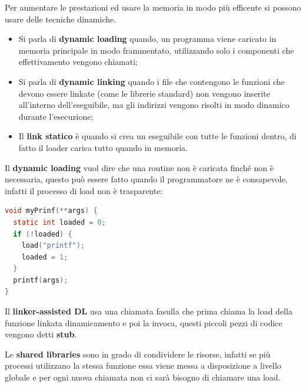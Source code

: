 \documentclass[12pt]{article}
\begin{document}
Per aumentare le prestazioni ed usare la memoria in modo pi\`u efficente si possono usare delle tecniche dinamiche.
\begin{itemize}
  \item Si parla di \textbf{dynamic loading} quando, un programma viene caricato in memoria principale in modo frammentato, utilizzando solo i componenti che effettivamento vengono chiamati;
  \item Si parla di \textbf{dynamic linking} quando i file che contengono le funzioni che devono essere linkate (come le librerie standard) non vengono inserite all'interno dell'eseguibile, ma gli indirizzi vengono risolti in modo dinamico durante l'esecuzione;
  \item Il \textbf{link statico} \`e quando si crea un eseguibile con tutte le funzioni dentro, di fatto il loader carica tutto quando in memoria.
\end{itemize}
Il \textbf{dynamic loading} vuol dire che una routine non \`e caricata finch\'e non \`e necessaria, questo pu\`o essere fatto quando il programmatore ne \`e consapevole, infatti il processo di load non \`e trasparente:
\begin{lstlisting}[language=c]
void myPrinf(**args) {
  static int loaded = 0;
  if (!loaded) {
    load("printf");
    loaded = 1;
  }
  printf(args);
}
\end{lstlisting}
Il \textbf{linker-assisted DL} usa una chiamata fasulla che prima chiama la load della funzione linkata dinamicamento e poi la invoca, questi piccoli pezzi di codice vengono detti \textbf{stub}.

\hfill 

Le \textbf{shared libraries} sono in grado di condividere le risorse, infatti se pi\`u processi utilizzano la stessa funzione essa viene messa a disposizione a livello globale e per ogni nuova chiamata non ci sar\`a bisogno di chiamare una load.
\end{document}
